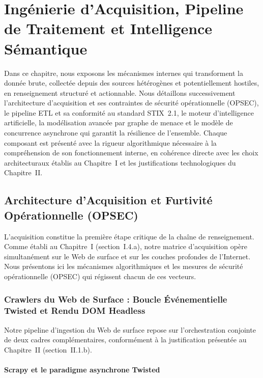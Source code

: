 \chapter{Ingénierie d'Acquisition, Pipeline de Traitement et Intelligence Sémantique}

Dans ce chapitre, nous exposons les mécanismes internes qui transforment la donnée brute, collectée depuis des sources hétérogènes et potentiellement hostiles, en renseignement structuré et actionnable. Nous détaillons successivement l'architecture d'acquisition et ses contraintes de sécurité opérationnelle (OPSEC), le pipeline ETL et sa conformité au standard STIX~2.1, le moteur d'intelligence artificielle, la modélisation avancée par graphe de menace et le modèle de concurrence asynchrone qui garantit la résilience de l'ensemble. Chaque composant est présenté avec la rigueur algorithmique nécessaire à la compréhension de son fonctionnement interne, en cohérence directe avec les choix architecturaux établis au Chapitre~I et les justifications technologiques du Chapitre~II.

\section{Architecture d'Acquisition et Furtivité Opérationnelle (OPSEC)}

L'acquisition constitue la première étape critique de la chaîne de renseignement. Comme établi au Chapitre~I (section~I.4.a), notre matrice d'acquisition opère simultanément sur le Web de surface et sur les couches profondes de l'Internet. Nous présentons ici les mécanismes algorithmiques et les mesures de sécurité opérationnelle (OPSEC) qui régissent chacun de ces vecteurs.

\subsection{Crawlers du Web de Surface : Boucle Événementielle Twisted et Rendu DOM Headless}

Notre pipeline d'ingestion du Web de surface repose sur l'orchestration conjointe de deux cadres complémentaires, conformément à la justification présentée au Chapitre~II (section~II.1.b).

\subsubsection{Scrapy et le paradigme asynchrone Twisted}

